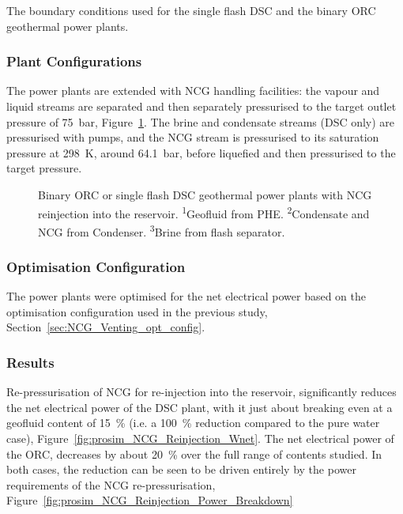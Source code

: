         \begin{table}[H]
            \centering
            \caption{The boundary conditions used for the single flash \ac{DSC} and the binary \ac{ORC} geothermal power plants.}
            \label{table:NCG_Reinj_BCs}
                    
        \end{table}

    \subsubsection{Plant Configurations}
    \label{sec:NCG_reinjection_plant_config}
        The power plants are extended with \ac{NCG} handling facilities: the vapour and liquid streams are separated and then separately pressurised to the target outlet pressure of \qty{75}{\bar}, Figure~\ref{fig:prosim_NCG_reinjection}. The brine and condensate streams (\ac{DSC} only) are pressurised with pumps, and the \ac{NCG} stream is pressurised to its saturation pressure at \qty{298}{\K}, around \qty{64.1}{\bar}, before liquefied and then pressurised to the target pressure.

        \begin{figure}[H]
            \centering
            
            \caption[Binary \ac{ORC} or single flash \ac{DSC} geothermal power plants with \ac{NCG} reinjection into the reservoir.]{Binary \ac{ORC} or single flash \ac{DSC} geothermal power plants with \ac{NCG} reinjection into the reservoir. \textsuperscript{1}Geofluid from \ac{PHE}. \textsuperscript{2}Condensate and \ac{NCG} from Condenser. \textsuperscript{3}Brine from flash separator.}
            \label{fig:prosim_NCG_reinjection}
        \end{figure}

    \subsubsection{Optimisation Configuration}
        The power plants were optimised for the net electrical power based on the optimisation configuration used in the previous study, Section~\ref{sec:NCG_Venting_opt_config}.

    \subsubsection{Results}
        Re-pressurisation of \ac{NCG} for re-injection into the reservoir, significantly reduces the net electrical power of the \ac{DSC} plant, with it just about breaking even at a geofluid  content of \qty{15}{\percent} (i.e. a \qty{100}{\percent} reduction compared to the pure water case), Figure~\ref{fig:prosim_NCG_Reinjection_Wnet}. The net electrical power of the \ac{ORC}, decreases by about \qty{20}{\percent} over the full range of  contents studied. In both cases, the reduction can be seen to be driven entirely by the power requirements of the \ac{NCG} re-pressurisation, Figure~\ref{fig:prosim_NCG_Reinjection_Power_Breakdown}
    
